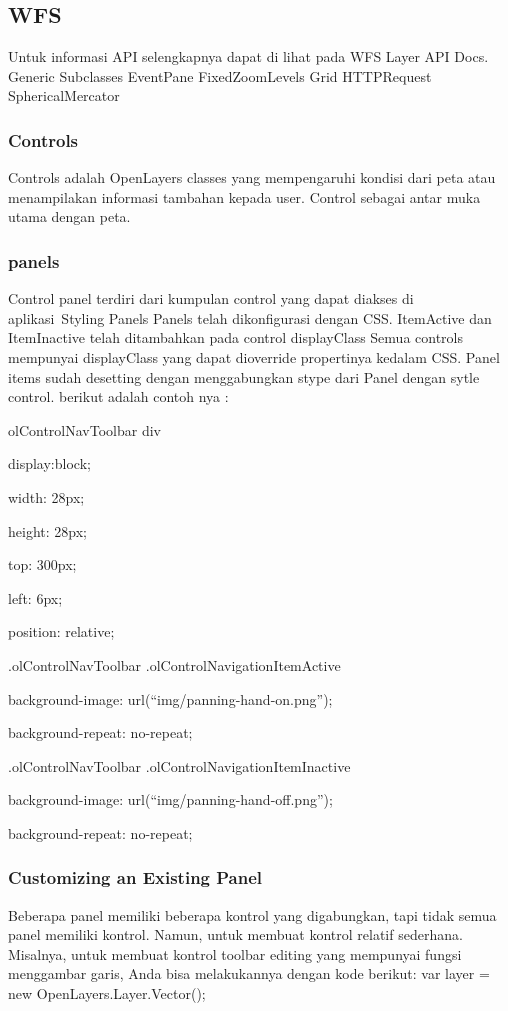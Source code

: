 \subsection {WFS}
Untuk informasi API selengkapnya dapat di lihat pada WFS Layer API Docs.
Generic Subclasses
EventPane
FixedZoomLevels
Grid
HTTPRequest
SphericalMercator

\subsubsection {Controls}
Controls adalah OpenLayers classes yang mempengaruhi kondisi dari peta atau menampilakan informasi tambahan kepada user. Control sebagai antar muka utama dengan peta.

\subsubsection {panels}
Control panel terdiri dari kumpulan control yang dapat diakses di aplikasi Styling Panels
Panels telah dikonfigurasi dengan CSS. ItemActive dan ItemInactive telah ditambahkan pada control displayClass
Semua controls mempunyai displayClass yang dapat dioverride propertinya kedalam CSS. Panel items sudah desetting dengan menggabungkan stype dari Panel dengan sytle control. berikut adalah contoh nya :

olControlNavToolbar div {

display:block;

width: 28px;

height: 28px;

top: 300px;

left: 6px;

position: relative;

}

.olControlNavToolbar .olControlNavigationItemActive {

background-image: url(“img/panning-hand-on.png”);

background-repeat: no-repeat;

}

.olControlNavToolbar .olControlNavigationItemInactive {

background-image: url(“img/panning-hand-off.png”);

background-repeat: no-repeat;

}

\subsubsection {Customizing an Existing Panel}
Beberapa panel  memiliki beberapa kontrol yang digabungkan, tapi tidak semua panel memiliki kontrol. Namun, untuk membuat kontrol relatif sederhana. Misalnya, untuk membuat kontrol toolbar editing yang mempunyai fungsi menggambar garis, Anda bisa melakukannya dengan kode berikut:
var layer = new OpenLayers.Layer.Vector();

